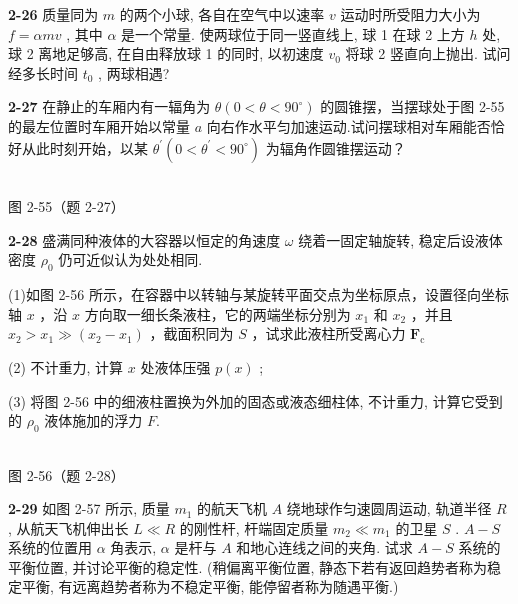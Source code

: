 \newpage

\textbf{2-26} 质量同为 $m$ 的两个小球, 各自在空气中以速率 $v$ 运动时所受阻力大小为 $f = \alpha mv$ , 其中 $\alpha$ 是一个常量. 使两球位于同一竖直线上, 球 1 在球 2 上方 $h$ 处, 球 2 离地足够高, 在自由释放球 1 的同时, 以初速度 $v_0$ 将球 2 竖直向上抛出. 试问经多长时间 $t_0$ , 两球相遇?

\newpage

\textbf{2-27} 在静止的车厢内有一辐角为 $\theta (0 < \theta < 90^{\circ})$ 的圆锥摆，当摆球处于图 2-55 的最左位置时车厢开始以常量 $a$ 向右作水平匀加速运动.试问摆球相对车厢能否恰好从此时刻开始，以某 $\theta^{\prime}(0 < \theta^{\prime} < 90^{\circ})$ 为辐角作圆锥摆运动？

\begin{center}
\resizebox{0.47\textwidth}{!}{}\\[4pt]
{\small 图 2-55（题 2-27）}
\end{center}

\newpage

\textbf{2-28} 盛满同种液体的大容器以恒定的角速度 $\omega$ 绕着一固定轴旋转, 稳定后设液体密度 $\rho_{0}$ 仍可近似认为处处相同.

(1)如图 2-56 所示，在容器中以转轴与某旋转平面交点为坐标原点，设置径向坐标轴 $x$ ，沿 $x$ 方向取一细长条液柱，它的两端坐标分别为 $x_{1}$ 和 $x_{2}$ ，并且 $x_{2} > x_{1} \gg (x_{2} - x_{1})$ ，截面积同为 $S$ ，试求此液柱所受离心力 $\pmb{F}_{\mathrm{c}}$

(2) 不计重力, 计算 $x$ 处液体压强 $p(x)$ ;

(3) 将图 2-56 中的细液柱置换为外加的固态或液态细柱体, 不计重力, 计算它受到的 $\rho_{0}$ 液体施加的浮力 $F$.

\begin{center}
\resizebox{0.50\textwidth}{!}{}\\[4pt]
{\small 图 2-56（题 2-28）}
\end{center}

\newpage

\textbf{2-29} 如图 2-57 所示, 质量 $m_{1}$ 的航天飞机 $A$ 绕地球作匀速圆周运动, 轨道半径 $R$ , 从航天飞机伸出长 $L \ll R$ 的刚性杆, 杆端固定质量 $m_{2} \ll m_{1}$ 的卫星 $S$ . $A-S$ 系统的位置用 $\alpha$ 角表示, $\alpha$ 是杆与 $A$ 和地心连线之间的夹角. 试求 $A-S$ 系统的平衡位置, 并讨论平衡的稳定性. (稍偏离平衡位置, 静态下若有返回趋势者称为稳定平衡, 有远离趋势者称为不稳定平衡, 能停留者称为随遇平衡.)

